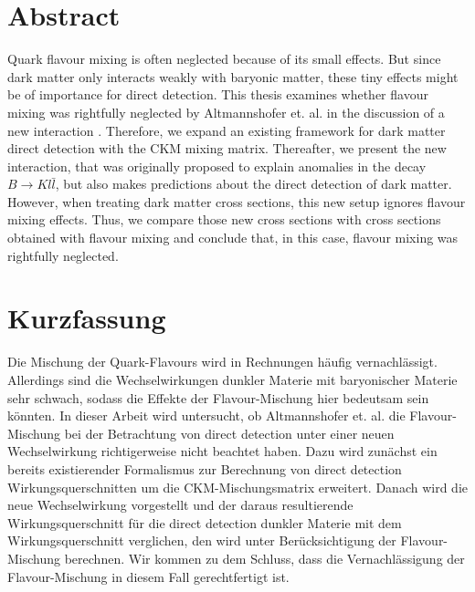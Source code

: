 \thispagestyle{plain}
\section*{Abstract}
Quark flavour mixing is often neglected because of its small effects. But since dark matter only interacts weakly with baryonic matter, these tiny effects might be of importance for direct detection. This thesis examines whether flavour mixing was rightfully neglected by Altmannshofer et. al. in the discussion of a new interaction \cite{Z}. Therefore, we expand an existing framework for dark matter direct detection with the CKM mixing matrix. Thereafter, we present the new interaction, that was originally proposed to explain anomalies in the decay $B\rightarrow Kl\bar{l}$, but also makes predictions about the direct detection of dark matter. However, when treating dark matter cross sections, this new setup ignores flavour mixing effects. Thus, we compare those new cross sections with cross sections obtained with flavour mixing and conclude that, in this case, flavour mixing was rightfully neglected.


\section*{Kurzfassung}
Die Mischung der Quark-Flavours wird in Rechnungen häufig vernachlässigt. Allerdings sind die Wechselwirkungen dunkler Materie mit baryonischer Materie sehr schwach, sodass die Effekte der Flavour-Mischung hier bedeutsam sein könn\-ten. In dieser Arbeit wird untersucht, ob Altmannshofer et. al. die Flavour-Mischung bei der Betrachtung von direct detection unter einer neuen Wechselwirkung \cite{Z} richtigerweise nicht beachtet haben. Dazu wird zunächst ein bereits existierender Formalismus zur Berechnung von direct detection Wirkungsquerschnitten um die CKM-Mischungsmatrix erweitert. Danach wird die neue Wechselwirkung vorgestellt und der daraus resultierende Wirkungsquerschnitt für die direct detection dunkler Materie mit dem Wirkungsquerschnitt verglichen, den wird unter Berücksichtigung der Flavour-Mischung berechnen. Wir kommen zu dem Schluss, dass die Vernachlässigung der Flavour-Mischung in diesem Fall gerechtfertigt ist.